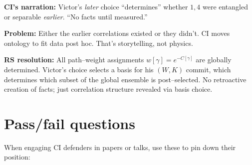 \documentclass[11pt]{article}
\begin{document}
\textbf{CI's narration:} Victor's \emph{later} choice ``determines'' whether $1,4$ were entangled or separable \emph{earlier}. ``No facts until measured.''

\textbf{Problem:} Either the earlier correlations existed or they didn't. CI moves ontology to fit data post hoc. That's storytelling, not physics.

\textbf{RS resolution:}
All path--weight assignments $w[\gamma]=e^{-C[\gamma]}$ are globally determined. Victor's choice selects a basis for his $(W,K)$ commit, which determines which subset of the global ensemble is post--selected. No retroactive creation of facts; just correlation structure revealed via basis choice.

\section{Pass/fail questions}

When engaging CI defenders in papers or talks, use these to pin down their position:
\end{document}
